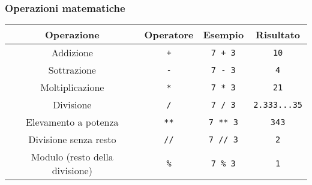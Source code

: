 \begin{contentframe}
    \frametitle{Operazioni matematiche}

    \centering
    \begin{tabular}{c|c|c|c}
        Operazione                      & Operatore     & Esempio           & Risultato             \\
        \midrule
        \midrule
        Addizione                       & \texttt{+}    & \texttt{7 + 3}    & \texttt{10}           \\
        Sottrazione                     & \texttt{-}    & \texttt{7 - 3}    & \texttt{4}            \\
        Moltiplicazione                 & \texttt{*}    & \texttt{7 * 3}    & \texttt{21}           \\
        Divisione                       & \texttt{/}    & \texttt{7 / 3}    & \texttt{2.333...35}   \\
        \midrule
        Elevamento a potenza            & \texttt{**}   & \texttt{7 ** 3}   & \texttt{343}          \\
        Divisione senza resto           & \texttt{//}   & \texttt{7 // 3}   & \texttt{2}            \\
        Modulo (resto della divisione)  & \texttt{\%}   & \texttt{7 \% 3}   & \texttt{1}            \\
    \end{tabular}
\end{contentframe}

